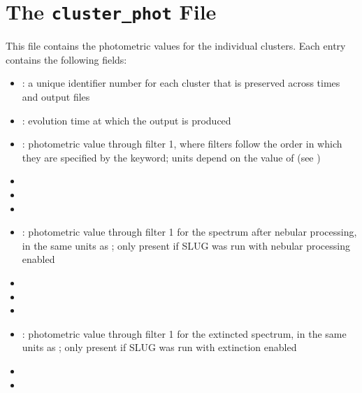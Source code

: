 \documentclass[letterpaper,10pt,english]{sphinxmanual}
\begin{document}
\section{The \texttt{cluster\_phot} File}
\label{output:the-cluster-phot-file}\label{output:ssec-cluster-phot-file}
This file contains the photometric values for the individual clusters. Each entry contains the following fields:
\begin{itemize}
\item {} 
: a unique identifier number for each cluster that is preserved across times and output files

\item {} 
: evolution time at which the output is produced

\item {} 
: photometric value through filter 1, where filters follow the order in which they are specified by the  keyword; units depend on the value of  (see {\hyperref[parameters:ssec-phot-keywords]{\emph{}}})

\item {} 

\item {} 

\item {} 

\item {} 
: photometric value through filter 1 for the spectrum after nebular processing, in the same units as ; only present if SLUG was run with nebular processing enabled

\item {} 

\item {} 

\item {} 

\item {} 
: photometric value through filter 1 for the extincted spectrum, in the same units as ; only present if SLUG was run with extinction enabled

\item {} 

\item {} 


\end{itemize}
\end{document}

